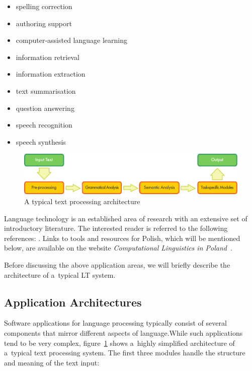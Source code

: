 \begin{multicols}{2}
\begin{itemize} \item spelling correction \item authoring support
\item computer-assisted language learning \item information retrieval
\item information extraction \item text summarisation \item question
answering \item speech recognition \item speech synthesis
\end{itemize} 

\begin{figure}[b]  \center
\includegraphics[width=\textwidth]{../_media/english/text_processing_app_architecture}
\caption{A typical text processing architecture} \label{fig:
textprocessingarch_en} 
\end{figure} 

Language technology is an established area of research with an
extensive set of introductory literature. The interested reader is
referred to the following references: \cite{jurafsky-martin01,
manning-schuetze1, lt-world1, lt-survey1, mykowiecka1}. Links to tools
and resources for Polish, which will be mentioned below, are available
on the website \textit{Computational Linguistics in
Poland}~\cite{Clip2}. 

Before discussing the above application areas, we will briefly
describe the architecture of a~typical LT system. 

\subsection{Application Architectures} 

Software applications for language processing typically consist of
several components that mirror different aspects of language.While such applications tend to be very complex, figure~\ref{fig:
textprocessingarch_en} shows a~highly simplified architecture of
a~typical text processing system. The first three modules handle the
structure and meaning of the text input: 


\end{multicols}
